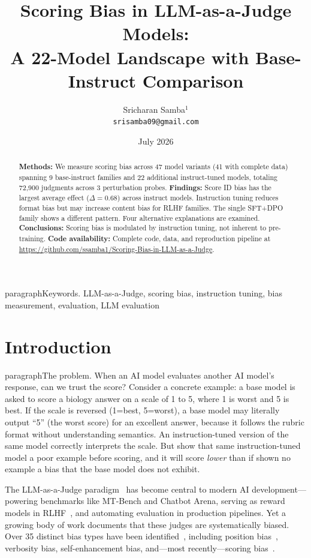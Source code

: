 \documentclass[11pt,twocolumn]{article}
\title{Scoring Bias in LLM-as-a-Judge Models:\\A 22-Model Landscape with Base-Instruct Comparison}
\author{Sricharan Samba$^1$ \\ \texttt{srisamba09@gmail.com}}
\date{July 2026}
\begin{document}
\maketitle

\thispagestyle{fancy}


paragraph{Keywords.} LLM-as-a-Judge, scoring bias, instruction tuning, bias measurement, evaluation, LLM evaluation

\begin{abstract}
\textbf{Methods:} We measure scoring bias across 47 model variants (41 with complete data) spanning 9 base-instruct families and 22 additional instruct-tuned models, totaling 72,900 judgments across 3 perturbation probes. \textbf{Findings:} Score ID bias has the largest average effect ($\Delta=0.68$) across instruct models. Instruction tuning reduces format bias but may increase content bias for RLHF families. The single SFT+DPO family shows a different pattern. Four alternative explanations are examined. \textbf{Conclusions:} Scoring bias is modulated by instruction tuning, not inherent to pre-training.
\textbf{Code availability:} Complete code, data, and reproduction pipeline at \url{https://github.com/ssamba1/Scoring-Bias-in-LLM-as-a-Judge}.
\end{abstract}

\section{Introduction}

paragraph{The problem.}
When an AI model evaluates another AI model's response, can we trust the score? Consider a concrete example: a base model is asked to score a biology answer on a scale of 1 to 5, where 1 is worst and 5 is best. If the scale is reversed (1=best, 5=worst), a base model may literally output ``5'' (the worst score) for an excellent answer, because it follows the rubric format without understanding semantics. An instruction-tuned version of the same model correctly interprets the scale. But show that same instruction-tuned model a poor example before scoring, and it will score \emph{lower} than if shown no example  a bias that the base model does not exhibit.

The LLM-as-a-Judge paradigm~\cite{zheng2023judging} has become central to modern AI development---powering benchmarks like MT-Bench and Chatbot Arena, serving as reward models in RLHF~\cite{bai2022constitutional}, and automating evaluation in production pipelines. Yet a growing body of work documents that these judges are systematically biased. Over 35 distinct bias types have been identified~\cite{ye2024justice,gu2024survey}, including position bias~\cite{wang2023large}, verbosity bias, self-enhancement bias, and---most recently---scoring bias~\cite{li2025scoring}.
\end{document}
